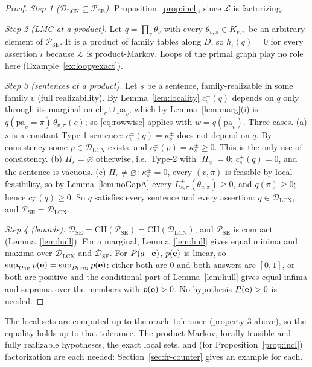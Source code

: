 \documentclass{article} %
\newcommand{\lo}{\underline}
\newcommand{\DSE}{\mathcal{D}_{\mathrm{SE}}}
\newcommand{\DLCN}{\mathcal{D}_{\mathrm{LCN}}}
\newcommand{\ch}{\mathrm{ch}}
\newcommand{\pa}{\mathrm{pa}}
\begin{document}
\begin{proof}
\emph{Step 1 ($\DLCN\subseteq\mathcal P_{\mathrm{SE}}$).} Proposition~\ref{prop:incl}, since
$\mathcal L$ is factorizing.

\emph{Step 2 (LMC at a product).} Let $q=\prod_v\theta_v$ with every $\theta_{v,\pi}\in K_{v,\pi}$ be
an arbitrary element of $\mathcal P_{\mathrm{SE}}$. It is a product of family tables along $D$, so
$h_\iota(q)=0$ for every assertion $\iota$ because $\mathcal L$ is product-Markov. Loops of the primal
graph play no role here (Example~\ref{ex:loopyexact}).

\emph{Step 3 (sentences at a product).} Let $s$ be a sentence, family-realizable in some family $v$
(full realizability). By Lemma~\ref{lem:locality} $c_s^\pm(q)$ depends on $q$ only through its
marginal on $\ch_v\cup\pa_v$, which by Lemma~\ref{lem:marg}(i) is $q(\pa_v{=}\pi)\,\theta_{v,\pi}(c)$;
so \eqref{eq:rowwise} applies with $w=q(\pa_v)$. Three cases.
(a) $s$ is a constant Type-1 sentence: $c_s^\pm(q)=\kappa_s^\pm$ does not depend on $q$. By
consistency some $p\in\DLCN$ exists, and $c_s^\pm(p)=\kappa_s^\pm\ge0$. This is the only use of
consistency.
(b) $\Pi_s=\varnothing$ otherwise, i.e.\ Type-2 with $|\Pi_\psi|=0$: $c_s^\pm(q)=0$, and the sentence is
vacuous.
(c) $\Pi_s\ne\varnothing$: $\kappa_s^\pm=0$, every $(v,\pi)$ is feasible by local feasibility, so by
Lemma~\ref{lem:noGapA} every $L^\pm_{s,\pi}(\theta_{v,\pi})\ge0$, and $q(\pi)\ge0$; hence
$c_s^\pm(q)\ge0$.
So $q$ satisfies every sentence and every assertion: $q\in\DLCN$, and
$\mathcal P_{\mathrm{SE}}=\DLCN$.

\emph{Step 4 (bounds).} $\DSE=\mathrm{CH}(\mathcal P_{\mathrm{SE}})=\mathrm{CH}(\DLCN)$, and
$\mathcal P_{\mathrm{SE}}$ is compact (Lemma~\ref{lem:hull}). For a marginal, Lemma~\ref{lem:hull}
gives equal minima and maxima over $\DLCN$ and $\DSE$. For $P(a\mid\mathbf{e})$, $p(\mathbf{e})$ is linear, so
$\sup_{\DSE}p(\be)=\sup_{\DLCN}p(\be)$: either both are $0$ and both answers are $[0,1]$, or both are
positive and the conditional part of Lemma~\ref{lem:hull} gives equal infima and suprema over the
members with $p(\mathbf{e})>0$. No hypothesis $\lo P(\be)>0$ is needed.
\end{proof}

The local sets are computed up to the oracle tolerance (property 3 above), so the equality holds up
to that tolerance. The product-Markov, locally feasible and fully realizable hypotheses, the exact
local sets, and (for Proposition~\ref{prop:incl}) factorization are each needed:
Section~\ref{sec:fr-counter} gives an example for each.
\end{document}
